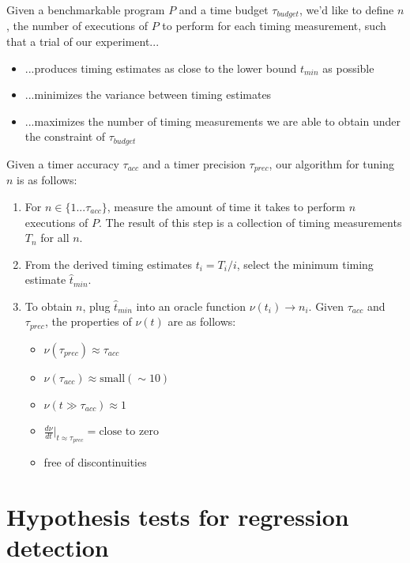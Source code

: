 \documentclass[conference]{IEEEtran}
\begin{document}
Given a benchmarkable program $P$ and a time budget $\tau_{budget}$, we'd like to define $n$, the number of executions of $P$ to perform for each timing measurement, such that a trial of our experiment...

\begin{itemize}
    \item ...produces timing estimates as close to the lower bound $t_{min}$ as possible
    \item ...minimizes the variance between timing estimates
    \item ...maximizes the number of timing measurements we are able to obtain under the constraint of $\tau_{budget}$
\end{itemize}

Given a timer accuracy $\tau_{acc}$ and a timer precision $\tau_{prec}$, our algorithm for tuning $n$ is as follows:

\begin{enumerate}
\item For $n \in \{1...\tau_{acc}\}$, measure the amount of time it takes to perform $n$ executions of $P$. The result of this step is a collection of timing measurements $T_n$ for all $n$.
\item From the derived timing estimates $t_i = T_i / i$, select the minimum timing estimate $\hat{t}_{min}$.
\item To obtain $n$, plug $\hat{t}_{min}$ into an oracle function $\nu(t_i) \to n_i$. Given $\tau_{acc}$ and $\tau_{prec}$, the properties of $\nu(t)$ are as follows:
\begin{itemize}
    \item $\nu(\tau_{prec}) \approx \tau_{acc}$
    \item $\nu(\tau_{acc}) \approx \text{small} (\sim 10)$
    \item $\nu(t \gg \tau_{acc}) \approx 1$
    \item $\frac{d\nu}{dt}\big|_{t \approx \tau_{prec}} = \text{close to zero}$
    \item free of discontinuities 
\end{itemize}
\end{enumerate}

\label{sec:regressions}
\section{Hypothesis tests for regression detection}
\end{document}
